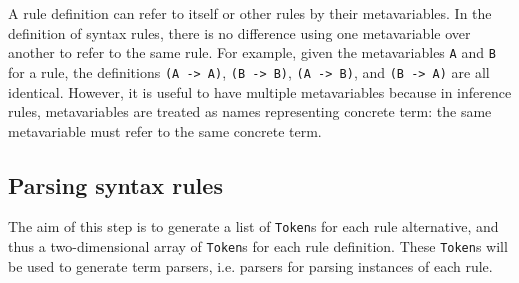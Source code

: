A rule definition can refer to itself or other rules by their metavariables. In the definition of syntax rules, there is no difference using one metavariable over another to refer to the same rule. For example, given the metavariables \lstinline{A} and \lstinline{B} for a rule, the definitions \lstinline{(A -> A)}, \lstinline{(B -> B)}, \lstinline{(A -> B)}, and \lstinline{(B -> A)} are all identical. However, it is useful to have multiple metavariables because in inference rules, metavariables are treated as names representing concrete term: the same metavariable must refer to the same concrete term.

\subsection{Parsing syntax rules}
\label{syntax:parsing}
The aim of this step is to generate a list of \lstinline{Token}s for each rule alternative, and thus a two-dimensional array of \lstinline{Token}s for each rule definition. These \lstinline{Token}s will be used to generate term parsers, i.e. parsers for parsing instances of each rule.

